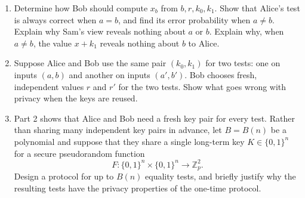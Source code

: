 \documentclass[11pt]{article}
\begin{document}
\begin{enumerate}
    \item Determine how Bob should compute $x_b$ from
    $b,r,k_0,k_1$. Show that Alice's test is always correct when $a=b$,
    and find its error probability when $a\ne b$. Explain why Sam's view
    reveals nothing about $a$ or $b$. Explain why, when $a\ne b$, the
    value $x+k_1$ reveals nothing about $b$ to Alice.

    \item Suppose Alice and Bob use the same pair $(k_0,k_1)$ for two
    tests: one on inputs $(a,b)$ and another on inputs $(a',b')$. Bob
    chooses fresh, independent values $r$ and $r'$ for the two tests.
    Show what goes wrong with privacy when the keys are reused.

    \item Part 2 shows that Alice and Bob need a fresh key pair for every
    test. Rather than sharing many independent key pairs in advance,
    let $B=B(n)$ be a polynomial and suppose that they share a single
    long-term key $K\in\{0,1\}^n$ for a secure pseudorandom function
    \[
        F:\{0,1\}^n\times\{0,1\}^n\longrightarrow
        \mathbb{Z}_p^2.
    \]
    Design a protocol for up to $B(n)$ equality tests, and briefly
    justify why the resulting tests have the privacy properties of the
    one-time protocol.
\end{enumerate}
\end{document}
